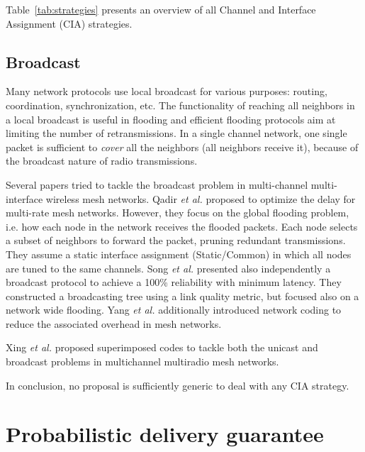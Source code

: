 \documentclass[twoside]{article}
\begin{document}
Table~\ref{tab:strategies} presents an overview of all Channel and Interface Assignment (CIA) strategies.



\subsection{Broadcast}



Many network protocols use local broadcast for various purposes: routing, coordination, synchronization, etc.
The functionality of reaching all neighbors in a local broadcast is useful in flooding and efficient flooding protocols aim at limiting the number of retransmissions.  
In a single channel network, one single packet is sufficient to \emph{cover} all the neighbors (all neighbors receive it), because of the broadcast nature of radio transmissions.


Several papers tried to tackle the broadcast problem in multi-channel multi-interface wireless mesh networks.
Qadir \textit{et al.} \cite{qadir07} proposed to optimize the delay for multi-rate mesh networks. 
However, they focus on the global flooding problem, i.e. how each node in the network receives the flooded packets.
Each node selects a subset of neighbors to forward the packet, pruning redundant transmissions.
They assume a static interface assignment (Static/Common) in which all nodes are tuned to the same channels.
Song \textit{et al.} \cite{song07} presented also independently a broadcast protocol to achieve a 100\% reliability with minimum latency. 
They constructed a broadcasting tree using a link quality metric, but focused also on a network wide flooding. 
Yang \textit{et al.} \cite{yang09} additionally introduced network coding to reduce the associated overhead in mesh networks.

Xing \textit{et al.}  \cite{xing07b} proposed superimposed codes to tackle both the unicast and broadcast problems in multichannel multiradio mesh networks.

In conclusion, no proposal is sufficiently generic to deal with any CIA strategy.









\section{Probabilistic delivery guarantee} 
\label{section:probGuarantee}
\end{document}
